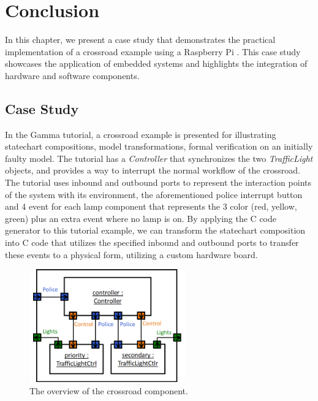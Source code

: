 \chapter{Conclusion}

In this chapter, we present a case study that demonstrates the practical implementation of a crossroad example using a Raspberry Pi \cite{Raspberry}. This case study showcases the application of embedded systems and highlights the integration of hardware and software components.

\section{Case Study}

In the Gamma tutorial, a crossroad example is presented for illustrating statechart compositions, model transformations, formal verification on an initially faulty model. The tutorial has a \textit{Controller} that synchronizes the two \textit{TrafficLight} objects, and provides a way to interrupt the normal workflow of the crossroad. The tutorial uses inbound and outbound ports to represent the interaction points of the system with its environment, the aforementioned police interrupt button and 4 event for each lamp component that represents the 3 color (red, yellow, green) plus an extra event where no lamp is on. By applying the C code generator to this tutorial example, we can transform the statechart composition into C code that utilizes the specified inbound and outbound ports to transfer these events to a physical form, utilizing a custom hardware board.

\begin{figure}[h]
	\centering
	\includegraphics[width=0.6\textwidth]{images/crossroad-component.png}
	\caption{The overview of the crossroad component.}
	\label{fig:crossroad}
\end{figure}

